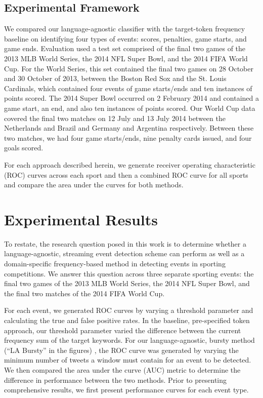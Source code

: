 \documentclass{acm_proc_article-sp}
\begin{document}
\subsection{Experimental Framework}

We compared our language-agnostic classifier with the target-token frequency baseline on identifying four types of events: scores, penalties, game starts, and game ends.
Evaluation used a test set comprised of the final two games of the 2013 MLB World Series, the 2014 NFL Super Bowl, and the 2014 FIFA World Cup.
For the World Series, this set contained the final two games on 28 October and 30 October of 2013, between the Boston Red Sox and the St. Louis Cardinals, which contained four events of game starts/ends and ten instances of points scored.
The 2014 Super Bowl occurred on 2 February 2014 and contained a game start, an end, and also ten instances of points scored.
Our World Cup data covered the final two matches on 12 July and 13 July 2014 between the Netherlands and Brazil and Germany and Argentina respectively.
Between these two matches, we had four game starts/ends, nine penalty cards issued, and four goals scored.

For each approach described herein, we generate receiver operating characteristic (ROC) curves across each sport and then a combined ROC curve for all sports and compare the area under the curves for both methods.

\section{Experimental Results}
\label{sect:results}

To restate, the research question posed in this work is to determine whether a language-agnostic, streaming event detection scheme can perform as well as a domain-specific frequency-based method in detecting events in sporting competitions.
We answer this question across three separate sporting events: the final two games of the 2013 MLB World Series, the 2014 NFL Super Bowl, and the final two matches of the 2014 FIFA World Cup.

For each event, we generated ROC curves by varying a threshold parameter and calculating the true and false positive rates.
In the baseline, pre-specified token approach, our threshold parameter varied the difference between the current frequency sum of the target keywords.
For our language-agnostic, bursty method (``LA Bursty'' in the figures) , the ROC curve was generated by varying the minimum number of tweets a window must contain for an event to be detected.
We then compared the area under the curve (AUC) metric to determine the difference in performance between the two methods.
Prior to presenting comprehensive results, we first present performance curves for each event type.
\end{document}
